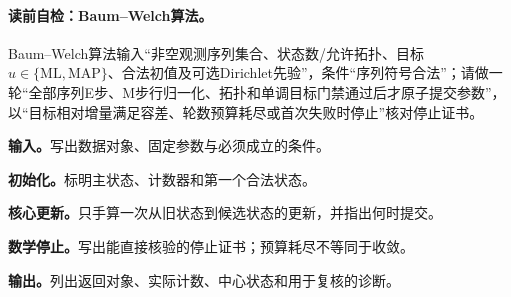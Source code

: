 \paragraph{读前自检：Baum--Welch算法。}Baum--Welch算法输入“非空观测序列集合、状态数/允许拓扑、目标$u\in\{\mathrm{ML},\mathrm{MAP}\}$、合法初值及可选Dirichlet先验”，条件“序列符号合法”；请做一轮“全部序列E步、M步行归一化、拓扑和单调目标门禁通过后才原子提交参数”，以“目标相对增量满足容差、轮数预算耗尽或首次失败时停止”核对停止证书。\par


\begin{keypointbox}[title={区分ML与MAP目标的Baum--Welch学习：五步阅读}]
\textbf{输入。}写出数据对象、固定参数与必须成立的条件。\par
\textbf{初始化。}标明主状态、计数器和第一个合法状态。\par
\textbf{核心更新。}只手算一次从旧状态到候选状态的更新，并指出何时提交。\par
\textbf{数学停止。}写出能直接核验的停止证书；预算耗尽不等同于收敛。\par
\textbf{输出。}列出返回对象、实际计数、中心状态和用于复核的诊断。
\end{keypointbox}

